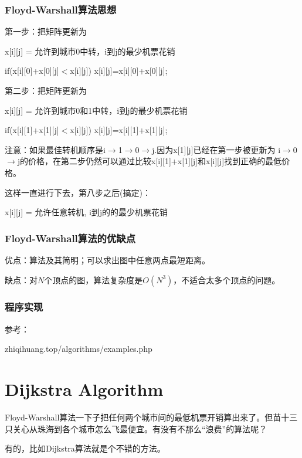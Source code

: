 \documentclass[CJK,14pt]{beamer}
\begin{document}
  \begin{frame}
    \frametitle{Floyd-Warshall算法思想}

    第一步：把矩阵更新为

    x[i][j] = 允许到城市0中转，i到j的最少机票花销

    {\blue \small
  if(x[i][0]+x[0][j]$<$x[i][j]) x[i][j]=x[i][0]+x[0][j];}

\skipline

第二步：把矩阵更新为

x[i][j] = 允许到城市0和1中转，i到j的最少机票花销

{\blue \small
  if(x[i][1]+x[1][j]$<$x[i][j]) x[i][j]=x[i][1]+x[1][j];}
    
{\scriptsize 注意：如果最佳转机顺序是i$\rightarrow$1$\rightarrow$0$\rightarrow$j.因为x[1][j]已经在第一步被更新为 i$\rightarrow$0$\rightarrow$j的价格，在第二步仍然可以通过比较x[i][1]+x[1][j]和x[i][j]找到正确的最低价格。}

这样一直进行下去，第八步之后(搞定)：

x[i][j] = 允许任意转机, i到j的的最少机票花销
  \end{frame}
  
  \begin{frame}
    \frametitle{Floyd-Warshall算法的优缺点}
    \bitem
  \item{优点：算法及其简明；可以求出图中任意两点最短距离。}
  \item{缺点：对$N$个顶点的图，算法复杂度是$O(N^3)$，不适合太多个顶点的问题。}
    \eitem
  \end{frame}

  \begin{frame}
    \frametitle{程序实现}

    参考：
    
    zhiqihuang.top/algorithms/examples.php
    
    
  \end{frame}

  \section{Dijkstra Algorithm}
  
  \begin{frame}
    Floyd-Warshall算法一下子把任何两个城市间的最低机票开销算出来了。但苗十三只关心从珠海到各个城市怎么飞最便宜。有没有不那么“浪费”的算法呢？

    \skiplines
    
    有的，比如Dijkstra算法就是个不错的方法。
  \end{frame}
  
\end{document}
